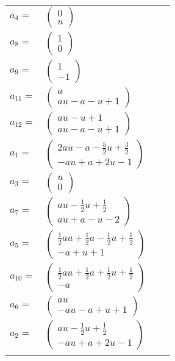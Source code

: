 \documentclass[1p]{elsarticle_modified}
\theoremstyle{definition}
\begin{document}
\begin{tabular}{m{7pt} m{180pt} m{7pt} m{180pt} }
\flushright $a_{4}=$&$\begin{pmatrix}0\\u\end{pmatrix}$ \\
\flushright $a_{8}=$&$\begin{pmatrix}1\\0\end{pmatrix}$ \\
\flushright $a_{9}=$&$\begin{pmatrix}1\\-1\end{pmatrix}$ \\
\flushright $a_{11}=$&$\begin{pmatrix}a\\a u- a- u+1\end{pmatrix}$ \\
\flushright $a_{12}=$&$\begin{pmatrix}a u- u+1\\a u- a- u+1\end{pmatrix}$ \\
\flushright $a_{1}=$&$\begin{pmatrix}2 a u- a-\frac{5}{2} u+\frac{3}{2}\\- a u+a+2 u-1\end{pmatrix}$ \\
\flushright $a_{3}=$&$\begin{pmatrix}u\\0\end{pmatrix}$ \\
\flushright $a_{7}=$&$\begin{pmatrix}a u-\frac{1}{2} u+\frac{1}{2}\\a u+a- u-2\end{pmatrix}$ \\
\flushright $a_{5}=$&$\begin{pmatrix}\frac{1}{2} a u+\frac{1}{2} a-\frac{1}{2} u+\frac{1}{2}\\- a+u+1\end{pmatrix}$ \\
\flushright $a_{10}=$&$\begin{pmatrix}\frac{1}{2} a u+\frac{1}{2} a+\frac{1}{2} u+\frac{1}{2}\\- a\end{pmatrix}$ \\
\flushright $a_{6}=$&$\begin{pmatrix}a u\\- a u- a+u+1\end{pmatrix}$ \\
\flushright $a_{2}=$&$\begin{pmatrix}a u-\frac{1}{2} u+\frac{1}{2}\\- a u+a+2 u-1\end{pmatrix}$\\&\end{tabular}
\end{document}
